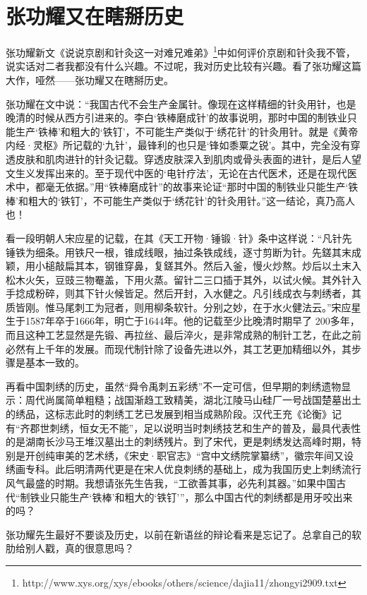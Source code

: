 \section{张功耀又在瞎掰历史}

张功耀新文《说说京剧和针灸这一对难兄难弟》\footnote{http://www.xys.org/xys/ebooks/others/science/dajia11/zhongyi2909.txt}中如何评价京剧和针灸我不管，说实话对二者我都没有什么兴趣。不过呢，我对历史比较有兴趣。看了张功耀这篇大作，哑然——张功耀又在瞎掰历史。

张功耀在文中说：“我国古代不会生产金属针。像现在这样精细的针灸用针，也是晚清的时候从西方引进来的。李白‘铁棒磨成针’的故事说明，那时中国的制铁业只能生产‘铁棒’和粗大的‘铁钉’，不可能生产类似于‘绣花针’的针灸用针。就是《黄帝内经·灵枢》所记载的‘九针’，最锋利的也只是‘锋如黍粟之锐’。其中，完全没有穿透皮肤和肌肉进针的针灸记载。穿透皮肤深入到肌肉或骨头表面的进针，是后人望文生义发挥出来的。至于现代中医的‘电针疗法’，无论在古代医术，还是在现代医术中，都毫无依据。”用“铁棒磨成针”的故事来论证“那时中国的制铁业只能生产‘铁棒’和粗大的‘铁钉’，不可能生产类似于‘绣花针’的针灸用针。”这一结论，真乃高人也！

看一段明朝人宋应星的记载，在其《天工开物·锤锻·针》条中这样说：“凡针先锤铁为细条。用铁尺一根，锥成线眼，抽过条铁成线，逐寸剪断为针。先鎈其末成颖，用小槌敲扁其本，钢锥穿鼻，复鎈其外。然后入釜，慢火炒熬。炒后以土末入松木火矢，豆豉三物罨盖，下用火蒸。留针二三口插于其外，以试火候。其外针入手捻成粉碎，则其下针火候皆足。然后开封，入水健之。凡引线成衣与刺绣者，其质皆刚。惟马尾刺工为冠者，则用柳条软针。分别之妙，在于水火健法云。”宋应星生于1587年卒于1666年，明亡于1644年。他的记载至少比晚清时期早了 200多年，而且这种工艺显然是先锻、再拉丝、最后淬火，是非常成熟的制针工艺，在此之前必然有上千年的发展。而现代制针除了设备先进以外，其工艺更加精细以外，其步骤是基本一致的。

再看中国刺绣的历史，虽然“舜令禹刺五彩绣”不一定可信，但早期的刺绣遗物显示：周代尚属简单粗糙；战国渐趋工致精美，湖北江陵马山硅厂一号战国楚墓出土的绣品，这标志此时的刺绣工艺已发展到相当成熟阶段。汉代王充《论衡》记有“齐郡世刺绣，恒女无不能”，足以说明当时刺绣技艺和生产的普及，最具代表性的是湖南长沙马王堆汉墓出土的刺绣残片。到了宋代，更是刺绣发达高峰时期，特别是开创纯审美的艺术绣，《宋史·职官志》“宫中文绣院掌纂绣”，徽宗年间又设绣画专科。此后明清两代更是在宋人优良刺绣的基础上，成为我国历史上刺绣流行风气最盛的时期。我想请张先生告我，“工欲善其事，必先利其器。”如果中国古代“制铁业只能生产‘铁棒’和粗大的‘铁钉’”，那么中国古代的刺绣都是用牙咬出来的吗？

张功耀先生最好不要谈及历史，以前在新语丝的辩论看来是忘记了。总拿自己的软肋给别人戳，真的很意思吗？
